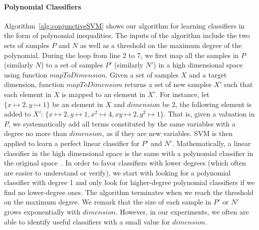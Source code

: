 \paragraph{Polynomial Classifiers} Algorithm~\ref{alg:conjunctiveSVM} shows our algorithm for learning classifiers in the form of polynomial inequalities. The inputs of the algorithm include the two sets of samples $P$ and $N$ as well as a threshold on the maximum degree of the polynomial. During the loop from line 2 to 7, we first map all the samples in $P$ (similarly $N$) to a set of samples $P'$ (similarly $N'$) in a high dimensional space using function $\mathit{mapToDimension}$. Given a set of samples $X$ and a target dimension, function $\mathit{mapToDimension}$ returns a set of new samples $X'$ such that each element in $X$ is mapped to an element in $X'$. For instance, let $\{x \mapsto 2, y \mapsto 1\}$ be an element in $X$ and $\mathit{dimension}$ be 2, the following element is added to $X'$: $\{x \mapsto 2, y \mapsto 1, x^2 \mapsto 4, xy \mapsto 2, y^2 \mapsto 1\}$. That is, given a valuation in $P$, we systematically add all terms constituted by the same variables with a degree no more than $\mathit{dimension}$, as if they are new variables.
SVM is then applied to learn a perfect linear classifier for $P'$ and $N'$. %
Mathematically, a linear classifier in the high dimensional space is the same with a polynomial classifier in the original space~\cite{???}. In order to favor classifiers with lower degrees (which often are easier to understand or verify), we start with looking for a polynomial classifier with degree 1 and only look for higher-degree polynomial classifiers if we find no lower-degree ones. The algorithm terminates when we reach the threshold on the maximum degree. We remark that the size of each sample in $P'$ or $N'$ grows exponentially with $\mathit{dimension}$. However, in our experiments, we often are able to identify useful classifiers with a small value for $\mathit{dimension}$. 

